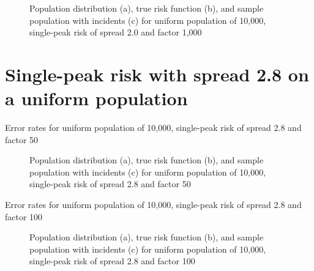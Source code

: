 \begin{figure}[H]
    
    \caption[]{Population distribution (a), true risk function (b), and sample population with incidents (c) for uniform population of 10,000, single-peak risk of \gls{spread} 2.0 and \gls{factor} 1,000}
    \label{fig:distributions:unif_1000_2.0_1h}    
\end{figure}


 
\section{Single-peak risk with spread 2.8 on a uniform population}
\label{sec:app:results_unif_2.8_1h}


\begin{table}[H]
    
    \caption[]{Error rates for uniform population of 10,000, single-peak risk of \gls{spread} 2.8 and \gls{factor} 50}
    \label{tab:mean_error_rates:unif_50_2.8_1h}
\end{table}

\begin{figure}[H]
    
    \caption[]{Population distribution (a), true risk function (b), and sample population with incidents (c) for uniform population of 10,000, single-peak risk of \gls{spread} 2.8 and \gls{factor} 50}
    \label{fig:distributions:unif_50_2.8_1h}    
\end{figure}



\begin{table}[H]

\caption[]{Error rates for uniform population of 10,000, single-peak risk of \gls{spread} 2.8 and \gls{factor} 100}
\label{tab:mean_error_rates:unif_100_2.8_1h}
\end{table}

\begin{figure}[H]
    
    \caption[]{Population distribution (a), true risk function (b), and sample population with incidents (c) for uniform population of 10,000, single-peak risk of \gls{spread} 2.8 and \gls{factor} 100}
    \label{fig:distributions:unif_100_2.8_1h}    
\end{figure}


